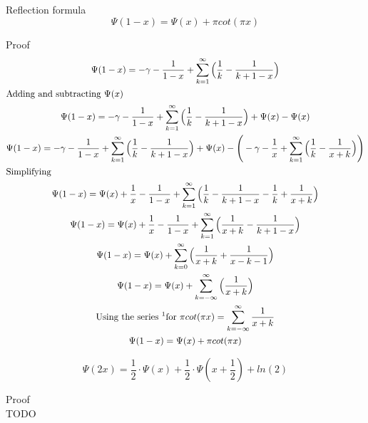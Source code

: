 \documentclass[a4paper]{article}
\begin{document}
    \begin{theorem}
        Reflection formula
        \begin{equation}
            \Psi(1-x) = \Psi(x) + \pi cot(\pi x) \label{eq:equation13}
        \end{equation}

        Proof
        \begin{gather*}
            \Psi(1-x) = -\gamma - \frac{1}{1-x} + \sum_{k=1}^{\infty} \Big( \frac{1}{k} - \frac{1}{k+1-x}  \Big)
            \\
            \intertext{Adding and subtracting $\Psi(x)$}
            \Psi(1-x) = -\gamma - \frac{1}{1-x} + \sum_{k=1}^{\infty} \Big( \frac{1}{k} - \frac{1}{k+1-x}  \Big) + \Psi(x) - \Psi(x)
            \\
            \Psi(1-x) = -\gamma - \frac{1}{1-x} + \sum_{k=1}^{\infty} \Big( \frac{1}{k} - \frac{1}{k+1-x}  \Big) + \Psi(x) - \Bigg(-\gamma - \frac{1}{x} + \sum_{k=1}^{\infty} \Big( \frac{1}{k} - \frac{1}{x+k}  \Big) \Bigg)
            \\
            \intertext{Simplifying}
            \Psi(1-x) = \Psi(x) + \frac{1}{x} - \frac{1}{1-x} + \sum_{k=1}^{\infty} \Big( \frac{1}{k} - \frac{1}{k+1-x}  -  \frac{1}{k} + \frac{1}{x+k} \Big)
            \\
            \Psi(1-x) = \Psi(x) + \frac{1}{x} - \frac{1}{1-x} + \sum_{k=1}^{\infty} \Big(\frac{1}{x+k} - \frac{1}{k+1-x} \Big)
            \\
            \Psi(1-x) = \Psi(x) + \sum_{k=0}^{\infty} \Big(\frac{1}{x+k} + \frac{1}{x -k -1} \Big)
            \\
            \Psi(1-x) = \Psi(x) + \sum_{k=-\infty}^{\infty} \Big(\frac{1}{x+k} \Big)
            \\
            \text{Using the series \footnotemark for }\pi cot(\pi x) = \sum_{k=-\infty}^{\infty} \frac{1}{x + k}
            \\
            \Psi(1-x) = \Psi(x) + \pi cot(\pi x)
        \end{gather*}
    \end{theorem}


    \begin{theorem}
        \begin{equation}
            \Psi(2x) = \frac{1}{2} \cdot \Psi(x) + \frac{1}{2} \cdot \Psi(x + \frac{1}{2}) + ln(2) \label{eq:equation14}
        \end{equation}

        Proof
        \\
        TODO
    \end{theorem}
\end{document}
